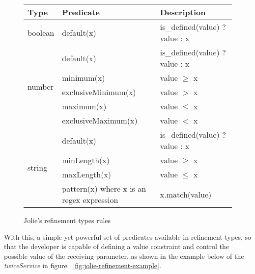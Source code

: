 \begin{figure}[ht]
    \begin{tabular}{ |l|l|l| }
        \hline
        Type    & Predicate                                            & Description                   \\
        \hline
        boolean & default(x)                                           & is_defined(value) ? value : x \\
        \hline
        \multirow{5}{4em}{number}
                & default(x)                                           & is_defined(value) ? value : x \\
                & minimum(x)                                           & value $\ge$ x                 \\
                & exclusiveMinimum(x)                                  & value $>$ x                   \\
                & maximum(x)                                           & value $\le$ x                 \\
                & exclusiveMaximum(x)                                  & value $<$ x                   \\
        \hline
        \multirow{4}{4em}{string}
                & default(x)                                           & is_defined(value) ? value : x \\
                & minLength(x)                                         & value $\ge$ x                 \\
                & maxLength(x)                                         & value $\le$ x                 \\
                & pattern(x) \footnotesize{where x is an regex expression} & x.match(value)                \\
        \hline
    \end{tabular}
    \caption{Jolie's refinement types rules}
    \label{fig:jolie-refinement-rules}
\end{figure}

With this, a simple yet powerful set of predicates available in refinement types, so that the developer is capable of defining a value constraint and control the possible value of the receiving parameter, as shown in the example below of the \textit{twiceService} in figure ~\ref{fig:jolie-refinement-example}.

